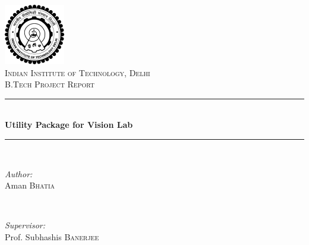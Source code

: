 \documentclass[12pt]{article}
\begin{document}
\begin{titlepage}

\newcommand{\HRule}{\rule{\linewidth}{0.5mm}} %

\center %


\includegraphics{logo.png}\\[1cm] %
 
 

\textsc{\LARGE Indian Institute of Technology, Delhi}\\[1.5cm] %
\textsc{\Large B.Tech Project Report}\\[0.5cm] %


\HRule \\[0.4cm]
{ \huge \bfseries Utility Package for Vision Lab}\\[0.4cm] %
\HRule \\[1.5cm]
 

\begin{minipage}{0.4\textwidth}
\begin{flushleft} \large
\emph{Author:}\\
Aman \textsc{Bhatia} %
\end{flushleft}
\end{minipage}
~
\begin{minipage}{0.4\textwidth}
\begin{flushright} \large
\emph{Supervisor:} \\
Prof. Subhashis \textsc{Banerjee} %
\end{flushright}
\end{minipage}\\[2cm]


\end{titlepage}
\end{document}
